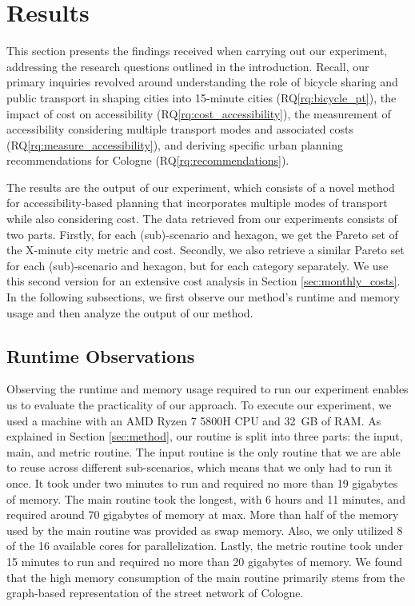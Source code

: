 \clearpage
\section{Results}
\label{sec:results}

This section presents the findings received when carrying out our experiment, addressing the research questions outlined in the introduction.
Recall, our primary inquiries revolved around understanding the role of bicycle sharing and public transport in shaping cities into 15-minute cities (RQ\ref{rq:bicycle_pt}), the impact of cost on accessibility (RQ\ref{rq:cost_accessibility}), the measurement of accessibility considering multiple transport modes and associated costs (RQ\ref{rq:measure_accessibility}), and deriving specific urban planning recommendations for Cologne (RQ\ref{rq:recommendations}).

The results are the output of our experiment, which consists of a novel method for accessibility-based planning that incorporates multiple modes of transport while also considering cost.
The data retrieved from our experiments consists of two parts.
Firstly, for each (sub)-scenario and hexagon, we get the Pareto set of the X-minute city metric and cost.
Secondly, we also retrieve a similar Pareto set for each (sub)-scenario and hexagon, but for each category separately.
We use this second version for an extensive cost analysis in Section \ref{sec:monthly_costs}.
In the following subsections, we first observe our method's runtime and memory usage and then analyze the output of our method.

\subsection{Runtime Observations}
\label{subsec:runtime_observations}

Observing the runtime and memory usage required to run our experiment enables us to evaluate the practicality of our approach.
To execute our experiment, we used a machine with an AMD Ryzen 7 5800H CPU and 32 GB of RAM.
As explained in Section \ref{sec:method}, our routine is split into three parts: the input, main, and metric routine.
The input routine is the only routine that we are able to reuse across different sub-scenarios, which means that we only had to run it once.
It took under two minutes to run and required no more than 19 gigabytes of memory.
The main routine took the longest, with 6 hours and 11 minutes, and required around 70 gigabytes of memory at max.
More than half of the memory used by the main routine was provided as swap memory.
Also, we only utilized 8 of the 16 available cores for parallelization.
Lastly, the metric routine took under 15 minutes to run and required no more than 20 gigabytes of memory.
We found that the high memory consumption of the main routine primarily stems from the graph-based representation of the street network of Cologne.

